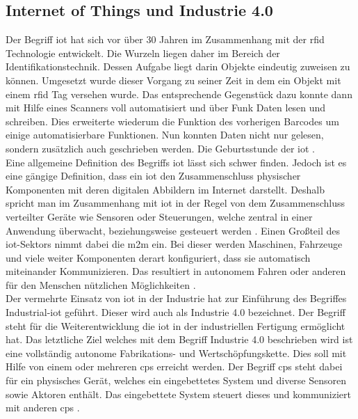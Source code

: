 \subsection{Internet of Things und Industrie 4.0}
\label{ss:grundlagen:iot}

\noindent Der Begriff \ac{iot} hat sich vor über 30 Jahren im Zusammenhang mit der \ac{rfid} Technologie entwickelt. Die Wurzeln liegen daher im Bereich der Identifikationstechnik. Dessen Aufgabe liegt darin Objekte eindeutig zuweisen zu können. Umgesetzt wurde dieser Vorgang zu seiner Zeit in dem ein Objekt mit einem \ac{rfid} Tag versehen wurde. Das entsprechende Gegenstück dazu konnte dann mit Hilfe eines Scanners voll automatisiert und über Funk Daten lesen und schreiben. Dies erweiterte wiederum die Funktion des vorherigen Barcodes um einige automatisierbare Funktionen. Nun konnten Daten nicht nur gelesen, sondern zusätzlich auch geschrieben werden. Die Geburtsstunde der \ac{iot} \cite[Seite 37]{Holtschulte20:IOS}.\\
\noindent Eine allgemeine Definition des Begriffs \ac{iot} lässt sich schwer finden. Jedoch ist es eine gängige Definition, dass ein \ac{iot} den Zusammenschluss physischer Komponenten mit deren digitalen Abbildern im Internet darstellt. Deshalb spricht man im Zusammenhang mit \ac{iot} in der Regel von dem Zusammenschluss verteilter Geräte wie Sensoren oder Steuerungen, welche zentral in einer Anwendung überwacht, beziehungsweise gesteuert werden \cite[Seite 33]{Holtschulte20:IOS}. Einen Großteil des \ac{iot}-Sektors nimmt dabei die \ac{m2m} ein. Bei dieser werden Maschinen, Fahrzeuge und viele weiter Komponenten derart konfiguriert, dass sie automatisch miteinander Kommunizieren. Das resultiert in autonomem Fahren oder anderen für den Menschen nützlichen Möglichkeiten \cite[Seite 449]{Holtschulte20:IOS}.\\
\noindent Der vermehrte Einsatz von \ac{iot} in der Industrie hat zur Einführung des Begriffes Industrial-\ac{iot} geführt. Dieser wird auch als Industrie 4.0 bezeichnet. Der Begriff steht für die Weiterentwicklung die \ac{iot} in der industriellen Fertigung ermöglicht hat. Das letztliche Ziel welches mit dem Begriff Industrie 4.0 beschrieben wird ist eine vollständig autonome Fabrikations- und Wertschöpfungskette. Dies soll mit Hilfe von einem oder mehreren \ac{cps} erreicht werden. Der Begriff \ac{cps} steht dabei für ein physisches Gerät, welches ein eingebettetes System und diverse Sensoren sowie Aktoren enthält. Das eingebettete System steuert dieses und kommuniziert mit anderen \ac{cps} \cite[Seite 30f]{Schell17:INS}.\\

